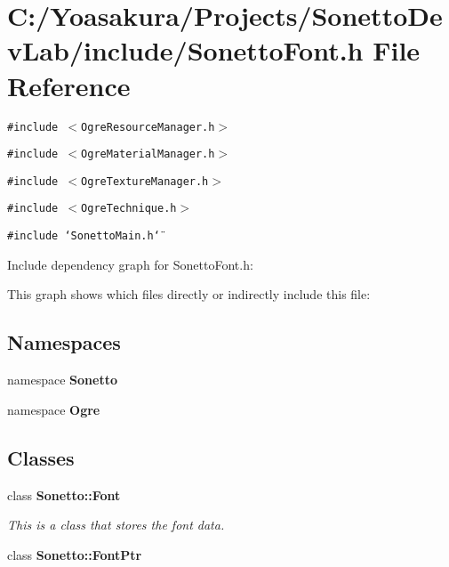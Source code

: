 \section{C:/Yoasakura/Projects/SonettoDevLab/include/SonettoFont.h File Reference}
\label{_sonetto_font_8h}
{\tt \#include $<$OgreResourceManager.h$>$}\par
{\tt \#include $<$OgreMaterialManager.h$>$}\par
{\tt \#include $<$OgreTextureManager.h$>$}\par
{\tt \#include $<$OgreTechnique.h$>$}\par
{\tt \#include \char`\"{}SonettoMain.h\char`\"{}}\par


Include dependency graph for SonettoFont.h:

This graph shows which files directly or indirectly include this file:\subsection*{Namespaces}
\begin{CompactItemize}
\item 
namespace {\bf Sonetto}
\item 
namespace {\bf Ogre}
\end{CompactItemize}
\subsection*{Classes}
\begin{CompactItemize}
\item 
class {\bf Sonetto::Font}
\begin{CompactList}\small\item\em This is a class that stores the font data. \item\end{CompactList}\item 
class {\bf Sonetto::FontPtr}
\end{CompactItemize}
